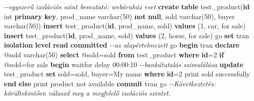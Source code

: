 \documentclass[
  magyar,
]{article}
\newenvironment{Shaded}{}{}
\newcommand{\CommentTok}[1]{\textcolor[rgb]{0.38,0.63,0.69}{\textit{#1}}}
\newcommand{\ControlFlowTok}[1]{\textcolor[rgb]{0.00,0.44,0.13}{\textbf{#1}}}
\newcommand{\DataTypeTok}[1]{\textcolor[rgb]{0.56,0.13,0.00}{#1}}
\newcommand{\DecValTok}[1]{\textcolor[rgb]{0.25,0.63,0.44}{#1}}
\newcommand{\KeywordTok}[1]{\textcolor[rgb]{0.00,0.44,0.13}{\textbf{#1}}}
\newcommand{\NormalTok}[1]{#1}
\newcommand{\OperatorTok}[1]{\textcolor[rgb]{0.40,0.40,0.40}{#1}}
\newcommand{\StringTok}[1]{\textcolor[rgb]{0.25,0.44,0.63}{#1}}
\begin{document}
\begin{Shaded}
\begin{Highlighting}[]
\CommentTok{{-}{-}egyszerű izolációs szint bemutató: webáruház eset}
\KeywordTok{create} \KeywordTok{table}\NormalTok{ test\_product(}\KeywordTok{id} \DataTypeTok{int} \KeywordTok{primary} \KeywordTok{key}\NormalTok{, prod\_name }\DataTypeTok{varchar}\NormalTok{(}\DecValTok{50}\NormalTok{) }\KeywordTok{not} \KeywordTok{null}\NormalTok{, sold}
\DataTypeTok{varchar}\NormalTok{(}\DecValTok{50}\NormalTok{), buyer }\DataTypeTok{varchar}\NormalTok{(}\DecValTok{50}\NormalTok{))}
\KeywordTok{insert}\NormalTok{ test\_product(}\KeywordTok{id}\NormalTok{, prod\_name, sold) }\KeywordTok{values}\NormalTok{ (}\DecValTok{1}\NormalTok{, }\StringTok{\textquotesingle{}car\textquotesingle{}}\NormalTok{, }\StringTok{\textquotesingle{}for sale\textquotesingle{}}\NormalTok{)}
\KeywordTok{insert}\NormalTok{ test\_product(}\KeywordTok{id}\NormalTok{, prod\_name, sold) }\KeywordTok{values}\NormalTok{ (}\DecValTok{2}\NormalTok{, }\StringTok{\textquotesingle{}horse\textquotesingle{}}\NormalTok{, }\StringTok{\textquotesingle{}for sale\textquotesingle{}}\NormalTok{)}
\NormalTok{go}
\KeywordTok{set}\NormalTok{ tran }\KeywordTok{isolation} \KeywordTok{level} \KeywordTok{read} \KeywordTok{committed} \CommentTok{{-}{-}az alapértelmezett}
\NormalTok{go}
\ControlFlowTok{begin}\NormalTok{ tran}
\KeywordTok{declare}\NormalTok{ @sold }\DataTypeTok{varchar}\NormalTok{(}\DecValTok{50}\NormalTok{)}
\KeywordTok{select}\NormalTok{ @sold}\OperatorTok{=}\NormalTok{sold }\KeywordTok{from}\NormalTok{ test\_product }\KeywordTok{where} \KeywordTok{id}\OperatorTok{=}\DecValTok{2}
\ControlFlowTok{if}\NormalTok{ @sold}\OperatorTok{=}\StringTok{\textquotesingle{}for sale\textquotesingle{}} \ControlFlowTok{begin}
\NormalTok{  waitfor delay }\StringTok{\textquotesingle{}00:00:10\textquotesingle{}} \CommentTok{{-}{-}bankátutalás szimulálása}
  \KeywordTok{update}\NormalTok{ test\_product }\KeywordTok{set}\NormalTok{ sold}\OperatorTok{=}\StringTok{\textquotesingle{}sold\textquotesingle{}}\NormalTok{, buyer}\OperatorTok{=}\StringTok{\textquotesingle{}My name\textquotesingle{}} \KeywordTok{where} \KeywordTok{id}\OperatorTok{=}\DecValTok{2}
\NormalTok{  print }\StringTok{\textquotesingle{}sold successfully\textquotesingle{}}
\ControlFlowTok{end} \ControlFlowTok{else}\NormalTok{ print }\StringTok{\textquotesingle{}product not available\textquotesingle{}}
\KeywordTok{commit}\NormalTok{ tran}
\NormalTok{go}
\CommentTok{{-}{-}Következtetés: körültekintően válaszd meg a megfelelő izolációs szintet.}
\end{Highlighting}
\end{Shaded}
\end{document}
